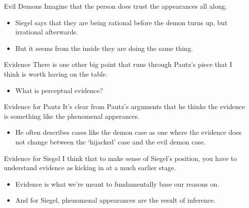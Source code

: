 \documentclass[
  17pt,
  letterpaper,
  ignorenonframetext,
  aspectratio=169,
  xcolor={dvipsnames}]{beamer}
\providecommand{\tightlist}{%
  \setlength{\itemsep}{0pt}\setlength{\parskip}{0pt}}\usepackage{longtable,booktabs,array}
\begin{document}
\begin{frame}{Evil Demons}
\protect\hypertarget{evil-demons-1}{}
Imagine that the person does trust the appearances all along.

\begin{itemize}[<+->]
\tightlist
\item
  Siegel says that they are being rational before the demon turns up,
  but irrational afterwards.
\item
  But it seems from the inside they are doing the same thing.
\end{itemize}
\end{frame}

\begin{frame}{Evidence}
\protect\hypertarget{evidence}{}
There is one other big point that runs through Pautz's piece that I
think is worth having on the table.

\begin{itemize}[<+->]
\tightlist
\item
  What is perceptual evidence?
\end{itemize}
\end{frame}

\begin{frame}{Evidence for Pautz}
\protect\hypertarget{evidence-for-pautz}{}
It's clear from Pautz's arguments that he thinks the evidence is
something like the phenomenal apperances.

\begin{itemize}[<+->]
\tightlist
\item
  He often describes cases like the demon case as one where the evidence
  does not change between the `hijacked' case and the evil demon case.
\end{itemize}
\end{frame}

\begin{frame}{Evidence for Siegel}
\protect\hypertarget{evidence-for-siegel}{}
I think that to make sense of Siegel's position, you have to understand
evidence as kicking in at a much earlier stage.

\begin{itemize}[<+->]
\tightlist
\item
  Evidence is what we're meant to fundamentally base our reasons on.
\item
  And for Siegel, phenomenal appearances are the result of inference.
\end{itemize}
\end{frame}
\end{document}
